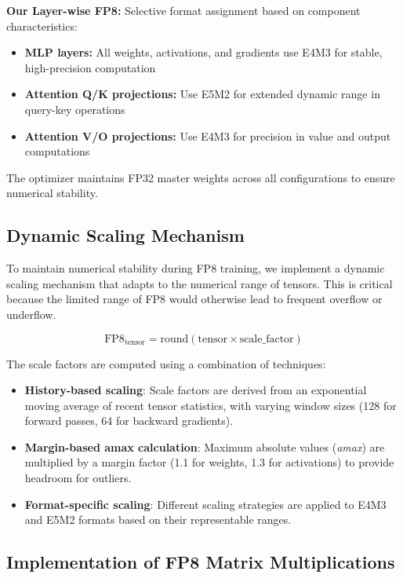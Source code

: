 \textbf{Our Layer-wise FP8:}
Selective format assignment based on component characteristics:
\begin{itemize}
\item \textbf{MLP layers:} All weights, activations, and gradients use E4M3 for stable, high-precision computation
\item \textbf{Attention Q/K projections:} Use E5M2 for extended dynamic range in query-key operations
\item \textbf{Attention V/O projections:} Use E4M3 for precision in value and output computations
\end{itemize}
The optimizer maintains FP32 master weights across all configurations to ensure numerical stability.

\subsection{Dynamic Scaling Mechanism}
To maintain numerical stability during FP8 training, we implement a dynamic scaling mechanism that adapts to the numerical range of tensors. This is critical because the limited range of FP8 would otherwise lead to frequent overflow or underflow.

\begin{equation}
    \text{FP8}_{\text{tensor}} = \text{round}(\text{tensor} \times \text{scale\_factor})
\end{equation}

The scale factors are computed using a combination of techniques:

\begin{itemize}
    \item \textbf{History-based scaling}: Scale factors are derived from an exponential moving average of recent tensor statistics, with varying window sizes (128 for forward passes, 64 for backward gradients).
    \item \textbf{Margin-based amax calculation}: Maximum absolute values (\textit{amax}) are multiplied by a margin factor (1.1 for weights, 1.3 for activations) to provide headroom for outliers.
    \item \textbf{Format-specific scaling}: Different scaling strategies are applied to E4M3 and E5M2 formats based on their representable ranges.
\end{itemize}

\subsection{Implementation of FP8 Matrix Multiplications}

